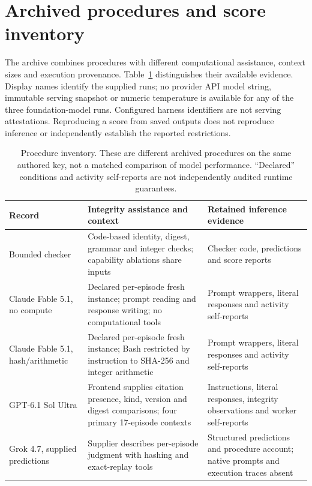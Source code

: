 \section{Archived procedures and score inventory}
\label{app:procedures}

The archive combines procedures with different computational assistance, context sizes and execution provenance. Table~\ref{tab:supp-procedures} distinguishes their available evidence. Display names identify the supplied runs; no provider API model string, immutable serving snapshot or numeric temperature is available for any of the three foundation-model runs. Configured harness identifiers are not serving attestations. Reproducing a score from saved outputs does not reproduce inference or independently establish the reported restrictions.

\begin{table}[t]
\caption{Procedure inventory. These are different archived procedures on the same authored key, not a matched comparison of model performance. ``Declared'' conditions and activity self-reports are not independently audited runtime guarantees.}
\label{tab:supp-procedures}
\small
\begin{tabularx}{\textwidth}{@{}p{}p{}X@{}}
\toprule
Record & Integrity assistance and context & Retained inference evidence\\
\midrule
Bounded checker & Code-based identity, digest, grammar and integer checks; capability ablations share inputs & Checker code, predictions and score reports\\
Claude Fable 5.1, no compute & Declared per-episode fresh instance; prompt reading and response writing; no computational tools & Prompt wrappers, literal responses and activity self-reports\\
Claude Fable 5.1, hash/arithmetic & Declared per-episode fresh instance; Bash restricted by instruction to SHA-256 and integer arithmetic & Prompt wrappers, literal responses and activity self-reports\\
GPT-6.1 Sol Ultra & Frontend supplies citation presence, kind, version and digest comparisons; four primary 17-episode contexts & Instructions, literal responses, integrity observations and worker self-reports\\
Grok 4.7, supplied predictions & Supplier describes per-episode judgment with hashing and exact-replay tools & Structured predictions and procedure account; native prompts and execution traces absent\\
\bottomrule
\end{tabularx}
\end{table}

